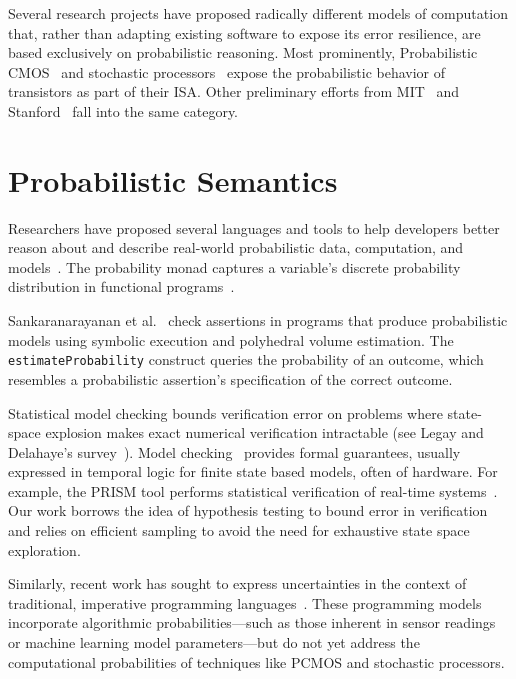 Several research projects have proposed radically different models of
computation that, rather than adapting existing software to expose its error
resilience, are based exclusively on probabilistic reasoning. Most
prominently, Probabilistic CMOS~\cite{pcmos, pcmos-cacm, palem-dac-position}
and stochastic processors~\cite{stochasticproc} expose the probabilistic
behavior of transistors as part of their ISA.
Other preliminary efforts from MIT~\cite{batesmit, lyric, mansinghka-circuits} and
Stanford~\cite{ersa} fall into the same category.

\section{Probabilistic Semantics}

Researchers have proposed several languages and tools to
help developers better reason about and describe real-world
probabilistic data, computation, and models~\cite{BBGR13,
  wingate-lightweight, church, chaganty, pfeffersample, pmonad,
  infernet, probdsl,uncertaint}.
The probability monad captures a variable's discrete probability
distribution in functional programs~\cite{pmonad}.

Sankaranarayanan et al.~\cite{sriram-pldi} check assertions in
programs that produce probabilistic models using symbolic execution
and polyhedral volume estimation. The \texttt{estimateProbability} construct
queries the probability of an outcome, which resembles a probabilistic
assertion's
specification of the correct outcome.

Statistical model checking bounds verification error on
problems where state-space explosion makes exact numerical
verification intractable (see Legay and Delahaye's
survey~\cite{legay10}).  Model checking~\cite{Clarke} provides formal guarantees,
usually expressed in temporal logic for finite state
based models, often of hardware. For example, the
PRISM tool performs statistical verification of real-time
systems~\cite{KNP11}. Our work borrows the idea of hypothesis
testing to bound error in verification~\cite{Younes,Younes20061368}
and
relies on efficient sampling to avoid
the need for exhaustive state space exploration.

Similarly, recent work has sought to express
uncertainties in the context of traditional, imperative programming
languages~\cite{uncertaint}. These programming models incorporate algorithmic
probabilities---such as those inherent in sensor readings or machine learning
model parameters---but do not yet address the computational probabilities of
techniques like PCMOS and stochastic processors.

